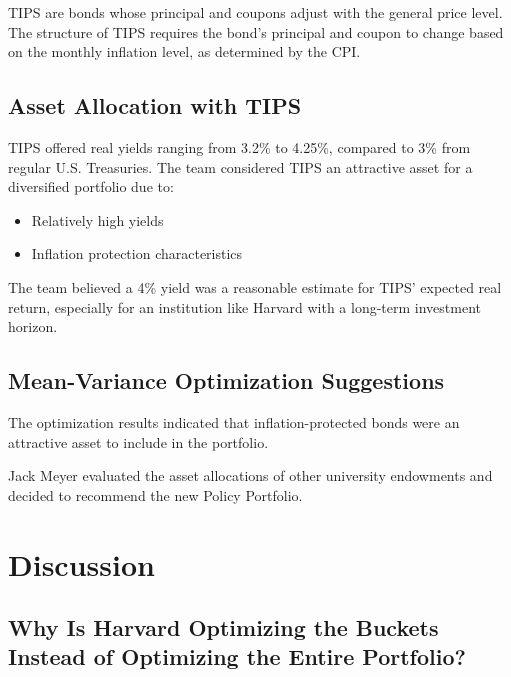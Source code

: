 \documentclass{article}
\begin{document}
TIPS are bonds whose principal and coupons adjust with the general price
level. The structure of TIPS requires the bond's principal and coupon to
change based on the monthly inflation level, as determined by the CPI.

\hypertarget{asset-allocation-with-tips}{%
\subsection{Asset Allocation with
TIPS}\label{asset-allocation-with-tips}}

TIPS offered real yields ranging from 3.2\% to 4.25\%, compared to 3\%
from regular U.S. Treasuries. The team considered TIPS an attractive
asset for a diversified portfolio due to:
\begin{itemize}
    \item Relatively high yields
    \item Inflation protection characteristics
\end{itemize}

The team believed a 4\% yield was a reasonable estimate for TIPS'
expected real return, especially for an institution like Harvard with a
long-term investment horizon.

\hypertarget{mean-variance-optimization-suggestions}{%
\subsection{Mean-Variance Optimization
Suggestions}\label{mean-variance-optimization-suggestions}}

The optimization results indicated that inflation-protected bonds were
an attractive asset to include in the portfolio.

Jack Meyer evaluated the asset allocations of other university
endowments and decided to recommend the new Policy Portfolio.

\hypertarget{discussion-the-harvard-management-company-and-inflation-protected-bonds}{%
\section{Discussion}\label{discussion-the-harvard-management-company-and-inflation-protected-bonds}}

\hypertarget{why-is-harvard-optimizing-the-buckets-instead-of-optimizing-the-entire-portfolio}{%
\subsection{Why Is Harvard Optimizing the Buckets Instead of Optimizing
the Entire
Portfolio?}\label{why-is-harvard-optimizing-the-buckets-instead-of-optimizing-the-entire-portfolio}}
\end{document}
